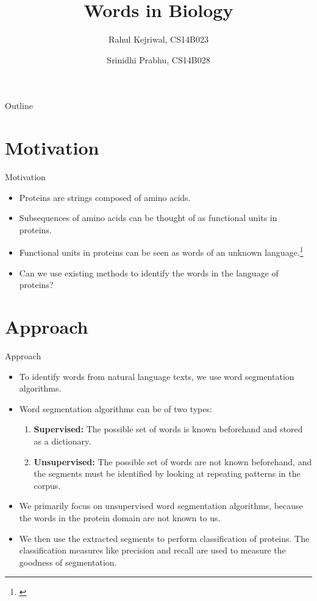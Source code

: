 \documentclass{beamer}
\title{Words in Biology}
\author[Rahul and Srinidhi]{Rahul Kejriwal, CS14B023 \and Srinidhi Prabhu, CS14B028}
\date{}
\institute%
{
  Indian Institute of Technology, Madras}
\begin{document}
\begin{frame}
  \titlepage
\end{frame}

\begin{frame}{Outline}
  \tableofcontents
\end{frame}

\section{Motivation}

\begin{frame}{Motivation}{}
  \begin{itemize}
  	\item Proteins are strings composed of amino acids.
  	\item Subsequences of amino acids can be thought of as functional units in proteins.
  	\item Functional units in proteins can be seen as words of an unknown language.\footnote{\cite{tendulkar2013parallels}} \pause
  	\item Can we use existing methods to identify the words in the language of proteins?
  \end{itemize}
\end{frame}

\section{Approach}

\begin{frame}{Approach}
  \begin{itemize}
  	\item To identify words from natural language texts, we use word segmentation algorithms.
  	\item Word segmentation algorithms can be of two types:
  	\begin{enumerate}
  		\item \textbf{Supervised:} The possible set of words is known beforehand and stored as a dictionary.
  		\item \textbf{Unsupervised:} The possible set of words are not known beforehand, and the segments must be identified by looking at repeating patterns in the corpus.
  	\end{enumerate}
  	\item We primarily focus on unsupervised word segmentation algorithms, because the words in the protein domain are not known to us.
  	\item We then use the extracted segments to perform classification of proteins. The classification measures like precision and recall are used to measure the goodness of segmentation.
  \end{itemize}
\end{frame}
\end{document}
